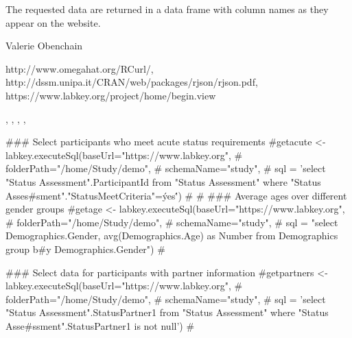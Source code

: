 \begin{Value}
The requested data are returned in a data frame with column names as they appear on the website.
\end{Value}
\begin{Author}\relax
Valerie Obenchain
\end{Author}
\begin{References}\relax
http://www.omegahat.org/RCurl/,\\ 
http://dssm.unipa.it/CRAN/web/packages/rjson/rjson.pdf,\\
https://www.labkey.org/project/home/begin.view
\end{References}
\begin{SeeAlso}\relax
{}, , , 
, 
\end{SeeAlso}
\begin{Examples}
\begin{ExampleCode}

### Select participants who meet acute status requirements
#getacute <- labkey.executeSql(baseUrl="https://www.labkey.org",
#                            folderPath="/home/Study/demo",
#                            schemaName="study",
#                            sql = 'select "Status Assessment".ParticipantId from "Status Assessment" where "Status Asses#sment"."StatusMeetCriteria"=\'yes\'')
#
#
### Average ages over different gender groups
#getage <- labkey.executeSql(baseUrl="https://www.labkey.org",
#                            folderPath="/home/Study/demo",
#                            schemaName="study",
#                            sql = "select Demographics.Gender, avg(Demographics.Age) as Number from Demographics group b#y Demographics.Gender")
#

### Select data for participants with partner information 
#getpartners <- labkey.executeSql(baseUrl="https://www.labkey.org",
#                            folderPath="/home/Study/demo",
#                            schemaName="study",
#                            sql = 'select "Status Assessment".StatusPartner1 from "Status Assessment" where "Status Asse#ssment".StatusPartner1 is not null')
#



\end{ExampleCode}
\end{Examples}

